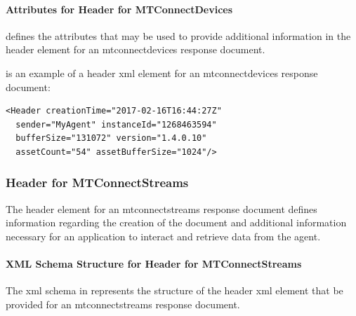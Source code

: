 \FloatBarrier

\paragraph{Attributes for Header for MTConnectDevices}\mbox{}

 defines the attributes that may be used to provide additional information in the \gls{header} element for an \gls{mtconnectdevices response document}. 



 is an example of a \gls{header} \gls{xml} element for an \gls{mtconnectdevices response document}:

\begin{lstlisting}[firstnumber=1,escapechar=|,%
caption={Example of Header XML Element for MTConnectDevices}, label={lst:header-xml-element-for-mtconnectdevices}]
<Header creationTime="2017-02-16T16:44:27Z"
  sender="MyAgent" instanceId="1268463594"
  bufferSize="131072" version="1.4.0.10"
  assetCount="54" assetBufferSize="1024"/>
\end{lstlisting}

\subsubsection{Header for MTConnectStreams}

The \gls{header} element for an \gls{mtconnectstreams response document} defines information regarding the creation of the document and additional information necessary for an application to interact and retrieve data from the \gls{agent}.

\paragraph{XML Schema Structure for Header for MTConnectStreams}\mbox{}

The \gls{xml schema} in  represents the structure of the \gls{header} \gls{xml} element that \MUST be provided for an \gls{mtconnectstreams response document}.  

